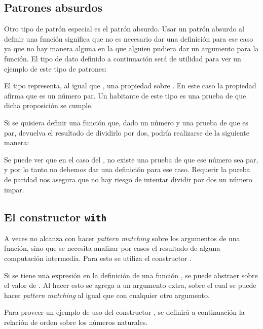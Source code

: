 \subsection{Patrones absurdos}

Otro tipo de patrón especial es el patrón absurdo. Usar un patrón absurdo al definir una función significa que no es necesario dar una definición para ese caso ya que no hay manera alguna en la que alguien pudiera dar un argumento para la función. El tipo de dato definido a continuación será de utilidad para ver un ejemplo de este tipo de patrones:


El tipo   representa, al igual que  , una propiedad sobre . En este caso la propiedad afirma que  es un número par. Un habitante de este tipo es una prueba de que dicha proposición se cumple. 

Si se quisiera definir una función que, dado un número y una prueba de que es par, devuelva el resultado de dividirlo por dos, podría realizarse de la siguiente manera:


Se puede ver que en el caso del , no existe una prueba de que ese número sea par, y por lo tanto no debemos dar una definición para ese caso. Requerir la pureba de paridad nos asegura que no hay riesgo de intentar dividir por dos un número impar. 

\subsection{El constructor \texttt{with}}

A veces no alcanza con hacer \textit{pattern matching} sobre los argumentos de una función, sino que se necesita analizar por casos el resultado de alguna computación intermedia. Para esto se utiliza el constructor . 

Si se tiene una expresión  en la definición de una función , se puede abstraer  sobre el valor de . Al hacer esto se agrega a  un argumento extra, sobre el cual se puede hacer \textit{pattern matching} al igual que con cualquier otro argumento. 

Para proveer un ejemplo de uso del constructor , se definirá a continuación la relación de orden \AgdaFunction{\_<\_} sobre los números naturales.

